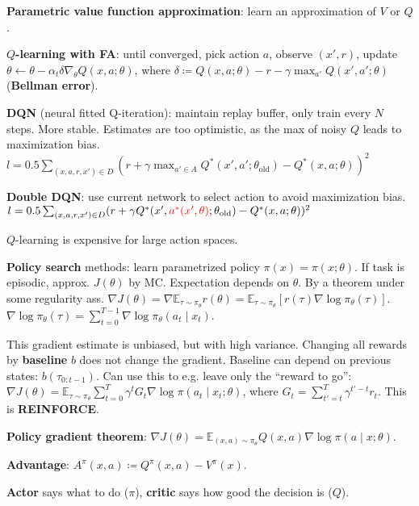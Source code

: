 \documentclass[11pt,landscape,a4paper,fleqn]{article}
\begin{document}
\begin{multicols*}{4}
\textbf{Parametric value function approximation}:
learn an approximation of \(V\) or \(Q\).

\textbf{\(Q\)-learning with FA}:
until converged, pick action \(a\), observe \((x', r)\), update \(\theta \leftarrow \theta - \alpha_t \delta \nabla_\theta Q(x, a; \theta)\),
where \(\delta \coloneqq Q(x, a; \theta) - r - \gamma \max_{a'} Q(x', a'; \theta)\) (\textbf{Bellman error}).

\textbf{DQN} (neural fitted Q-iteration): maintain replay buffer, only train every \(N\) steps.
More stable. Estimates are too optimistic, as the max of noisy \(Q\) leads to maximization bias.
\(l = 0.5\sum_{(x, a, r, x') \in D} (r + \gamma \max_{a' \in A} Q^*(x', a'; \theta_{\mathrm{old}}) - Q^*(x, a; \theta))^2\)

\textbf{Double DQN}: use current network to select action to avoid maximization bias.
\(l = 0.5\sum_{(x, a, r, x') \in D} (r + \gamma Q^*(x', \textcolor{red}{a^*(x', \theta)}; \theta_{\mathrm{old}}) - Q^*(x, a; \theta))^2\)

\(Q\)-learning is expensive for large action spaces.

\textbf{Policy search} methods: learn parametrized policy \(\pi(x) = \pi(x; \theta)\).
If task is episodic, approx. \(J(\theta)\) by MC.
Expectation depends on \(\theta\).
By a theorem under some regularity ass. \(\nabla J(\theta) = \nabla \mathbb{E}_{\tau \sim \pi_\theta} r(\theta) = \mathbb{E}_{\tau \sim \pi_\theta} [r(\tau) \nabla \log \pi_\theta(\tau)]\).
\(\nabla \log \pi_\theta(\tau) = \sum_{t = 0}^{T - 1} \nabla \log \pi_\theta(a_t \mid x_t)\).

This gradient estimate is unbiased, but with high variance.
Changing all rewards by \textbf{baseline} \(b\) does not change the gradient.
Baseline can depend on previous states: \(b(\tau_{0:t - 1})\).
Can use this to e.g. leave only the ``reward to go'':
\(\nabla J(\theta) = \mathbb{E}_{\tau \sim \pi_\theta} \sum_{t = 0}^T \gamma^t G_t \nabla \log \pi(a_t \mid x_t; \theta)\),
where \(G_t = \sum_{t' = t}^T \gamma^{t' - t} r_t\).
This is \textbf{REINFORCE}.

\textbf{Policy gradient theorem}: \(\nabla J(\theta) = \mathbb{E}_{(x, a) \sim \pi_\theta} Q(x, a) \nabla \log \pi(a \mid x; \theta)\).

\textbf{Advantage}: \(A^\pi(x, a) \coloneqq Q^\pi(x, a) - V^\pi(x)\).

\textbf{Actor} says what to do (\(\pi\)), \textbf{critic} says how good the decision is (\(Q\)).


\end{multicols*}
\end{document}
